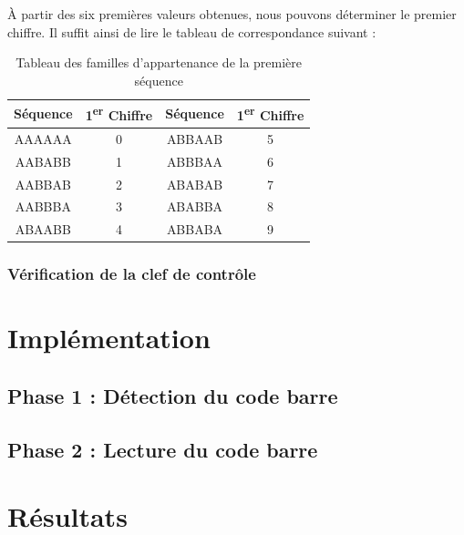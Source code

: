 \documentclass{rapport}
\begin{document}
À partir des six premières valeurs obtenues, nous pouvons déterminer le premier chiffre. 
Il suffit ainsi de lire le tableau de correspondance suivant :

\begin{table}[h!]
    \centering
    \renewcommand{\arraystretch}{1.5} %
    \begin{tabular}{|c|c|c|c|}
        \hline
        \textbf{Séquence} & \textbf{1\textsuperscript{er} Chiffre} & \textbf{Séquence} & \textbf{1\textsuperscript{er} Chiffre} \\ \hline
        AAAAAA & 0 & ABBAAB & 5 \\ \hline
        AABABB & 1 & ABBBAA & 6 \\ \hline
        AABBAB & 2 & ABABAB & 7 \\ \hline
        AABBBA & 3 & ABABBA & 8 \\ \hline
        ABAABB & 4 & ABBABA & 9 \\ \hline
    \end{tabular}
    \caption{Tableau des familles d’appartenance de la première séquence}
    \label{tab:sequence}
\end{table}

\subsubsection*{Vérification de la clef de contrôle}

\section{Implémentation}

\subsection{Phase 1 : Détection du code barre}
\subsection{Phase 2 : Lecture du code barre}

\section{Résultats}
\end{document}
